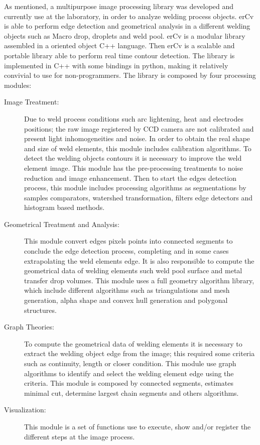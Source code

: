 \documentclass[12pt]{iopart}
\begin{document}
As mentioned, a multipurpose image processing library was developed 
and currently use at the laboratory, in order to analyze welding process objects.
erCv is able to perform edge detection and geometrical analysis in a different 
welding objects such as Macro drop, droplets and weld pool.
erCv is a modular library assembled in a oriented object C++ language. Then erCv is a scalable 
and portable library able to perform real time
 contour detection. The library is implemented in  C++ with some bindings in python,
 making it relatively convivial to use for non-programmers.
The library is composed by four processing modules: 
\begin{description}
\item[Image Treatment:] Due to weld process conditions such arc lightening, 
 heat and electrodes positions; the raw image registered by CCD 
 camera are not calibrated and present light inhomogeneities and 
 noise. In order to obtain the real shape and size of weld elements, this module 
 includes calibration algorithms. To detect the welding objects contours it is 
 necessary to improve the weld element image. This module has the 
 pre-processing treatments to noise reduction and image enhancement.
 Then to start the edges detection process, this module includes processing
 algorithms as segmentations by samples comparators, watershed transformation,
 filters edge detectors and histogram based methods.  
\item[Geometrical Treatment and Analysis:] This module convert edges pixels points into connected 
   segments to conclude the edge detection
  process, completing and in some cases extrapolating the weld
  elements edge. It is also responsible to compute the geometrical 
  data of welding elements such weld pool surface and metal transfer drop volumes. 
  This module uses a full geometry algorithm library\cite{CGAL}, which include different algorithms
  such as triangulations and mesh generation, alpha shape and 
  convex hull generation and polygonal structures.
\item[Graph Theories:] To compute the geometrical data of welding elements
   it is necessary to extract the welding object edge from the image; this
   required some criteria such as continuity, length or closer condition.
   This module use graph algorithms to  identify and select the welding element edge using the
   criteria. This module is composed by connected segments, estimates
   minimal cut, determine largest chain segments and others algorithms. 
\item[Visualization:] This module is a set of 
  functions use to execute, show and/or register the 
  different steps at the image process.
\end{description}
\end{document}
